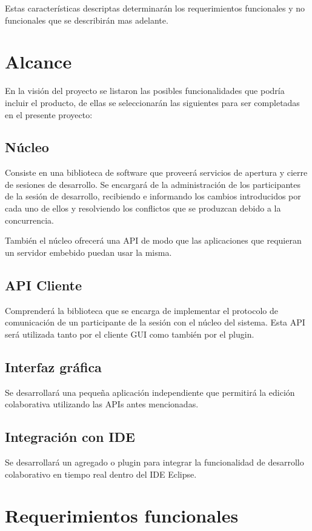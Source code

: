 \documentclass[12pt,a4paper]{article}
\begin{document}
Estas características descriptas determinarán los requerimientos funcionales y no funcionales que se describirán mas adelante.

	\section{Alcance}
   En la visión del proyecto se listaron las posibles funcionalidades que podría incluir el producto, de ellas se seleccionarán las siguientes para ser completadas en el presente proyecto:
   
	\subsection{Núcleo}
	Consiste en una biblioteca de software que proveerá servicios de apertura y cierre de sesiones de desarrollo. Se encargará de la administración de los participantes de la sesión de desarrollo, recibiendo e informando los cambios introducidos por cada uno de ellos y resolviendo los conflictos que se produzcan debido a la concurrencia.
	
	También el núcleo ofrecerá una API de modo que las aplicaciones que requieran un servidor embebido puedan usar la misma.

	\subsection{API Cliente}
	Comprenderá la biblioteca que se encarga de implementar el protocolo de comunicación de un participante de la sesión con el núcleo del sistema. Esta API será utilizada tanto por el cliente GUI como también por el plugin.

	\subsection{Interfaz gráfica}
	Se desarrollará una pequeña aplicación independiente que permitirá la edición colaborativa utilizando las APIs antes mencionadas.

	\subsection{Integración con IDE}
	Se desarrollará un agregado o plugin para integrar la funcionalidad de desarrollo colaborativo en tiempo real dentro del IDE Eclipse.

	\section{Requerimientos funcionales}
	
\end{document}
